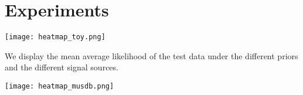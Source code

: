 \section{Experiments}

\begin{marginfigure}
    \texttt{[image: heatmap\_toy.png]}%
    \caption{We display the mean average likelihood of the test data under the different priors and the different signal sources.}%
    \label{fig:heatmap_toy}
\end{marginfigure}
\begin{marginfigure}
    \texttt{[image: heatmap\_musdb.png]}%
    \label{fig:heatmap_musdb}
\end{marginfigure}
